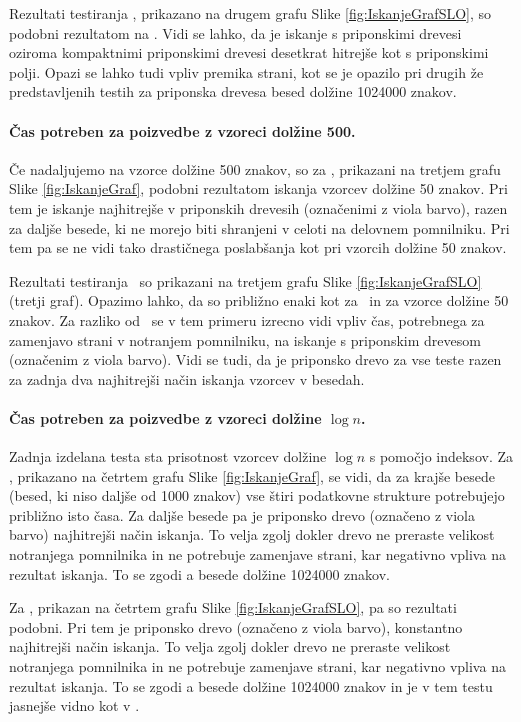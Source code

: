 Rezultati testiranja \NK, prikazano na drugem grafu Slike \ref{fig:IskanjeGrafSLO}, so podobni rezultatom na \DNK. Vidi se lahko, da je iskanje s priponskimi drevesi oziroma kompaktnimi priponskimi drevesi desetkrat hitrejše kot s priponskimi polji. Opazi se lahko tudi vpliv premika strani, kot se je opazilo pri drugih že predstavljenih testih za priponska drevesa besed dolžine 1024000 znakov. 

\paragraph{Čas potreben za poizvedbe z vzoreci dolžine 500.}
Če nadaljujemo na vzorce dolžine 500 znakov, so za \DNK, prikazani na tretjem grafu Slike \ref{fig:IskanjeGraf}, podobni rezultatom iskanja vzorcev dolžine 50 znakov. Pri tem je iskanje najhitrejše v priponskih drevesih (označenimi z viola barvo), razen za daljše besede, ki ne morejo biti shranjeni v celoti na delovnem pomnilniku. Pri tem pa se ne vidi tako drastičnega poslabšanja kot pri vzorcih dolžine 50 znakov.

Rezultati testiranja \NK\ so prikazani na tretjem grafu Slike \ref{fig:IskanjeGrafSLO} (tretji graf). Opazimo lahko, da so približno enaki kot za \DNK\ in za vzorce dolžine 50 znakov. Za razliko od \DNK\ se v tem primeru izrecno vidi vpliv čas, potrebnega za zamenjavo strani v notranjem pomnilniku, na iskanje s priponskim drevesom (označenim z viola barvo). Vidi se tudi, da je priponsko drevo za vse teste razen za zadnja dva najhitrejši način iskanja vzorcev v besedah.

\paragraph{Čas potreben za poizvedbe z vzoreci dolžine $\log{n}$.}
Zadnja izdelana testa sta prisotnost vzorcev dolžine $\log{n}$ s pomočjo indeksov. Za \DNK, prikazano na četrtem grafu Slike \ref{fig:IskanjeGraf}, se vidi, da za krajše besede (besed, ki niso daljše od 1000 znakov) vse štiri podatkovne strukture potrebujejo približno isto časa. Za daljše besede pa je priponsko drevo (označeno z viola barvo) najhitrejši način iskanja. To velja zgolj dokler drevo ne preraste velikost notranjega pomnilnika in ne potrebuje zamenjave strani, kar negativno vpliva na rezultat iskanja. To se zgodi a besede dolžine 1024000 znakov.

Za \NK, prikazan na četrtem grafu Slike \ref{fig:IskanjeGrafSLO}, pa so rezultati podobni. Pri tem je priponsko drevo (označeno z viola barvo), konstantno najhitrejši način iskanja. To velja zgolj dokler drevo ne preraste velikost notranjega pomnilnika in ne potrebuje zamenjave strani, kar negativno vpliva na rezultat iskanja. To se zgodi a besede dolžine 1024000 znakov in  je v tem testu jasnejše vidno kot v \DNK.

